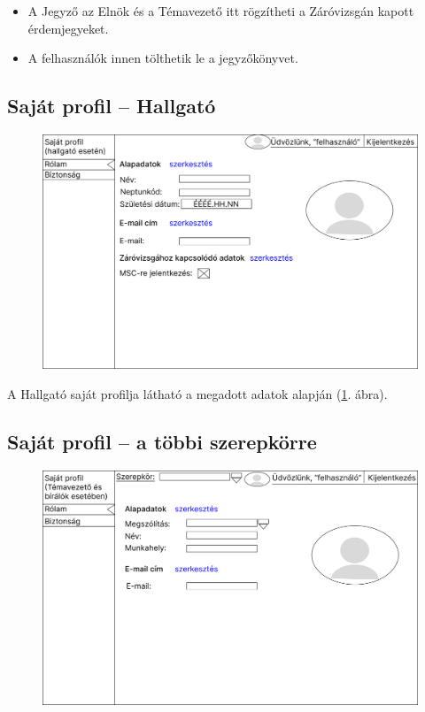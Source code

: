 \documentclass[a4paper,12pt]{article}
\begin{document}
\begin{itemize}
	\item A Jegyző az Elnök és a Témavezető itt rögzítheti a Záróvizsgán kapott érdemjegyeket.
	\item A felhasználók innen tölthetik le a jegyzőkönyvet.
\end{itemize}

\subsection{Saját profil -- Hallgató}

\begin{figure}
	\centering
	\includegraphics[width=\textwidth]{images/Web_pages/My_Profile_Student.jpg}
	\caption{}
	\label{fig:My_Profile_Student}
\end{figure}

A Hallgató saját profilja látható a megadott adatok alapján (\ref{fig:My_Profile_Student}. ábra).

\subsection{Saját profil -- a többi szerepkörre}

\begin{figure}
	\centering
	\includegraphics[width=\textwidth]{images/Web_pages/My_Profile.jpg}
	\caption{}
	\label{fig:My_Profile}
\end{figure}
\end{document}
